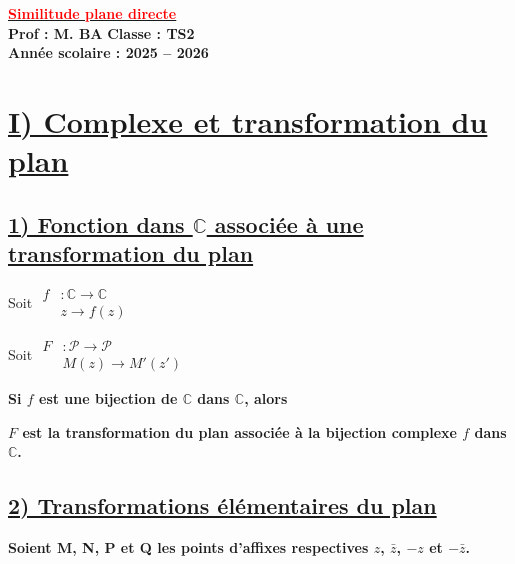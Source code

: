 \documentclass[12pt,a4paper]{article}
\begin{document}
\begin{center}
    \Large\textbf{\underline{\textcolor{red}{Similitude plane directe}}}\\[-0.1cm]
    \normalsize\textbf{Prof : M. BA} \hfill \textbf{Classe : TS2}\\[-0.1cm]
    \textbf{Année scolaire : 2025 -- 2026}
\end{center}


\section*{\underline{I) Complexe et transformation du plan}}

\subsection*{\underline{1) Fonction dans $\mathbb{C}$ associée à une transformation du plan}}

\noindent

\begin{minipage}{0.5\textwidth}
    Soit $\begin{aligned}f &: \mathbb{C} \to \mathbb{C}\\ &z \to f(z)\end{aligned}$
\end{minipage}
\begin{minipage}{0.5\textwidth}
   Soit $\begin{aligned}F &: \mathcal{P} \to \mathcal{P}\\ &M(z) \to M'(z')\end{aligned}$
\end{minipage}

\vspace{1em}

\noindent \textbf{Si $f$ est une bijection de $\mathbb{C}$ dans $\mathbb{C}$, alors}

\vspace{1em}

\noindent \textbf{$F$ est la transformation du plan associée à la bijection complexe $f$ dans $\mathbb{C}$.}

\subsection*{\underline{2) Transformations élémentaires du plan}}

\noindent \textbf{Soient M, N, P et Q les points d'affixes respectives $z$, $\bar{z}$, $-z$ et $-\bar{z}$.}
\end{document}
